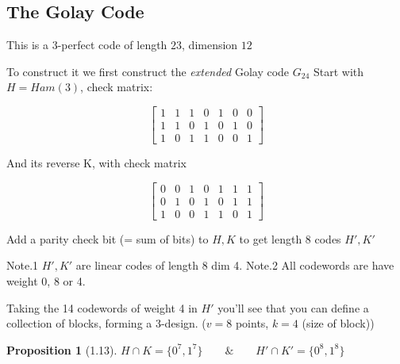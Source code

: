 \documentclass[]{article}
\newtheorem{prop}[thm]{Proposition}
\theoremstyle{definition}
\theoremstyle{remark}
\numberwithin{equation}{section}
\begin{document}
	\subsection{The Golay Code}
		This is a 3-perfect code of length $23$, dimension $12$

		To construct it we first construct the \emph{extended} Golay code $G_24$
		Start with $H = Ham(3)$, check matrix:

		\[
			\begin{bmatrix}
			1 & 1 & 1 & 0 & 1 & 0 & 0  \\
			1 & 1 & 0 & 1 & 0 & 1 & 0  \\
			1 & 0 & 1 & 1 & 0 & 0 & 1
			\end{bmatrix}
		\]

		And its reverse K, with check matrix

		\[
			\begin{bmatrix}
			0 & 0 & 1 & 0 & 1 & 1 & 1\\
			0 & 1 & 0 & 1 & 0 & 1 & 1\\
			1 & 0 & 0 & 1 & 1 & 0 & 1
			\end{bmatrix}
		\]

		Add a parity check bit (= sum of bits) to $H, K$ to get length 8 codes $H', K'$


		Note.1 $H', K'$ are linear codes of length 8 dim 4.
		Note.2 All codewords are have weight 0, 8 or 4.

		Taking the 14 codewords of weight 4 in $H'$ you'll see that you can define a collection of blocks, forming a 3-design. ($v=8$ points, $k=4$ (size of block))

		\begin{prop}[1.13]
		$H \cap K = \{0^7, 1^7\} \qquad \&  \qquad H'\cap K' = \{0^8, 1^8 \}$
		\end{prop}
\end{document}
